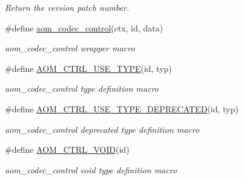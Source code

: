\begin{DoxyCompactItemize}
\begin{DoxyCompactList}\small\item\em Return the version patch number. \end{DoxyCompactList}\item 
\#define \hyperlink{group__codec_ga6da974f4eeaba1fa74106b28d0fe6ac5}{aom\+\_\+codec\+\_\+control}(ctx,  id,  data)
\begin{DoxyCompactList}\small\item\em aom\+\_\+codec\+\_\+control wrapper macro \end{DoxyCompactList}\item 
\#define \hyperlink{group__codec_ga09132e6ec2eb0affabe3391181d15f95}{A\+O\+M\+\_\+\+C\+T\+R\+L\+\_\+\+U\+S\+E\+\_\+\+T\+Y\+PE}(id,  typ)
\begin{DoxyCompactList}\small\item\em aom\+\_\+codec\+\_\+control type definition macro \end{DoxyCompactList}\item 
\#define \hyperlink{group__codec_ga9cf4b5ac7ea31c5c1b71816aec572acf}{A\+O\+M\+\_\+\+C\+T\+R\+L\+\_\+\+U\+S\+E\+\_\+\+T\+Y\+P\+E\+\_\+\+D\+E\+P\+R\+E\+C\+A\+T\+ED}(id,  typ)
\begin{DoxyCompactList}\small\item\em aom\+\_\+codec\+\_\+control deprecated type definition macro \end{DoxyCompactList}\item 
\#define \hyperlink{group__codec_ga777f7eab335b851d90e40715efa5396c}{A\+O\+M\+\_\+\+C\+T\+R\+L\+\_\+\+V\+O\+ID}(id)
\begin{DoxyCompactList}\small\item\em aom\+\_\+codec\+\_\+control void type definition macro \end{DoxyCompactList}\end{DoxyCompactItemize}
